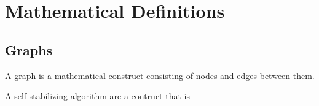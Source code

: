 
\section{Mathematical Definitions}
\label{sec:math-defin}

\subsection{Graphs}
\label{sec:graphs}

A \gls{graph} is a mathematical construct
  consisting of \glspl{node} and \glspl{edge} between them.

A self-stabilizing algorithm are a contruct that is 

